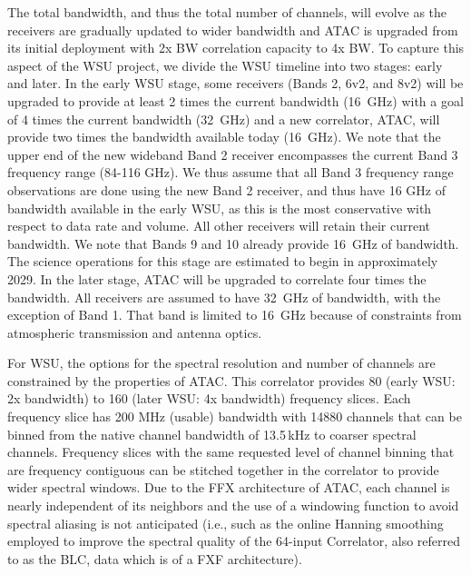\documentclass[preprint]{aastex631}
\begin{document}
The total bandwidth, and thus the total number of channels, will evolve as the receivers are gradually updated to wider bandwidth and ATAC is upgraded from its initial deployment with 2x BW correlation capacity to 4x BW. To capture this aspect of the WSU project, we divide the WSU timeline into two stages: early and later. In the early WSU stage, some receivers (Bands 2, 6v2, and 8v2) will be upgraded to provide at least 2 times the current bandwidth (16~GHz) with a goal of 4 times the current bandwidth (32~GHz) and a new correlator, ATAC, will provide two times the bandwidth available today (16~GHz). We note that the upper end of the new wideband Band 2 receiver encompasses the current Band 3 frequency range (84-116 GHz).  We thus assume that all Band 3 frequency range observations are done using the new Band 2 receiver, and thus have 16 GHz of bandwidth available in the early WSU, as this is the most conservative with respect to data rate and volume. All other receivers will retain their current bandwidth. We note that Bands 9 and 10 already provide 16~GHz of bandwidth. The science operations for this stage are estimated to begin in approximately 2029. In the later stage, ATAC will be upgraded to correlate four times the bandwidth. All receivers are assumed to have 32~GHz of bandwidth, with the exception of Band 1. That band is limited to 16~GHz because of constraints from atmospheric transmission and antenna optics.

For WSU, the options for the spectral resolution and number of channels are constrained by the properties of ATAC. This correlator provides 80 (early WSU: 2x bandwidth) to 160 (later WSU: 4x bandwidth) frequency slices. Each frequency slice has 200 MHz (usable) bandwidth with 14880 channels that can be binned from the native channel bandwidth of 13.5\,kHz to coarser spectral channels. Frequency slices with the same requested level of channel binning that are frequency contiguous can be stitched together in the correlator to provide wider spectral windows. Due to the FFX architecture of ATAC, each channel is nearly independent of its neighbors and the use of a windowing function to avoid spectral aliasing is not anticipated (i.e., such as the online Hanning smoothing employed to improve the spectral quality of the 64-input Correlator, also referred to as the BLC, data which is of a FXF architecture).
\end{document}
